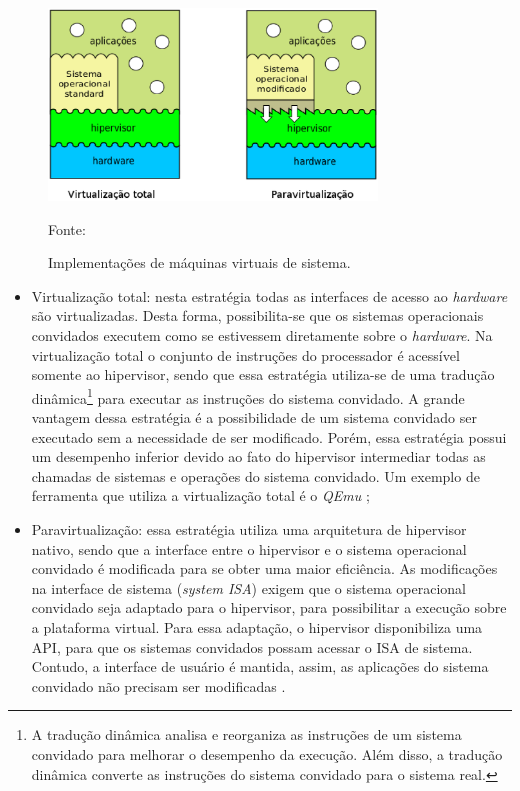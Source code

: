\begin{figure}[h!]
 \centering
 \includegraphics[width=330px]{img/vms_implementacao.eps}
 \caption{Implementações de máquinas virtuais de sistema.}
 \label{fig:vms_implementacao}
 Fonte: \citet{maziero2013}
\end{figure}

\begin{itemize}
 \item Virtualização total: nesta estratégia todas as interfaces de acesso ao \textit{hardware} são virtualizadas. Desta forma, possibilita-se 
 que os sistemas operacionais convidados executem como se estivessem diretamente sobre o \textit{hardware}. Na virtualização total o conjunto de 
 instruções do processador é acessível somente ao hipervisor, sendo que essa estratégia utiliza-se de uma tradução dinâmica\footnote[1]{A tradução 
 dinâmica analisa e reorganiza as instruções de um sistema convidado para melhorar o desempenho da execução. Além disso, a tradução dinâmica 
 converte as instruções do sistema convidado para o sistema real.} para executar as instruções do sistema convidado. A grande vantagem dessa 
 estratégia é a possibilidade de um sistema convidado ser executado sem a necessidade de ser modificado. Porém, essa estratégia possui um 
 desempenho inferior devido ao fato do hipervisor intermediar todas as chamadas de sistemas e operações do sistema convidado. Um exemplo de 
 ferramenta que utiliza a virtualização total é o \textit{QEmu} \cite{qemu};
 \item Paravirtualização: essa estratégia utiliza uma arquitetura de hipervisor nativo, sendo que a interface entre o hipervisor e o sistema 
 operacional convidado é modificada para se obter uma maior eficiência. As modificações na interface de sistema (\textit{system \ac{ISA}}) 
 exigem que o sistema operacional convidado seja adaptado para o hipervisor, para possibilitar a execução sobre a plataforma virtual. Para essa 
 adaptação, o hipervisor disponibiliza uma \ac{API}, para que os sistemas convidados possam acessar o \ac{ISA} de sistema. Contudo, a interface 
 de usuário é mantida, assim, as aplicações do sistema convidado não precisam ser modificadas \cite{maziero2013}.
\end{itemize}

